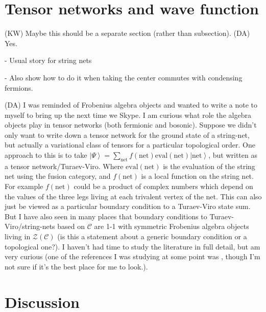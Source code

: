\documentclass[12pt,a4paper]{article}
\newcommand{\mcz}{\mathcal{Z}}
\newcommand{\mcc}{\mathcal{C}}
\newcommand{\ket}[1]{\ensuremath{\left|#1\right\rangle}}
\newcommand{\dave}[1]{{\color{ao(english)}\footnotesize{(DA) #1}}}
\newcommand{\kw}[1]{{\color{kwcolor}\footnotesize{(KW) #1}}}
\begin{document}



\section{Tensor networks and wave function}
\kw{Maybe this should be a separate section (rather than subsection).}
\dave{Yes.}

- Usual story for string nets

- Also show how to do it when taking the center commutes with condensing fermions. 


\dave{
I was reminded of Frobenius algebra objects and wanted to write a note to myself to bring up the next time we Skype.
I am curious what role the algebra objects play in tensor networks (both fermionic and bosonic).
Suppose we didn't only want to write down a tensor network for the ground state of a string-net, 
but actually a variational class of tensors for a particular topological order.
One approach to this is to take $\ket{\Psi} = \sum_{\text{net}} f(\text{net}) \text{eval}(\text{net}) \ket{\text{net}}$, but written as a tensor network/Turaev-Viro. 
Where $\text{eval}(\text{net})$ is the evaluation of the string net using the fusion category, 
and $f(\text{net})$ is a local function on the string net.
For example $f(\text{net})$ could be a product of complex numbers which depend on the values of the three legs living at each trivalent vertex of the net. 
This can also just be viewed as a particular boundary condition to a Turaev-Viro state sum.
But I have also seen in many places that boundary conditions to Turaev-Viro/string-nets 
based on $\mcc$ are 1-1 with symmetric Frobenius algebra objects living in $\mcz(\mcc)$ (is this a statement about a generic boundary condition or a topological one?).
I haven't had time to study the literature in full detail, but am very curious 
(one of the references I was studying at some point was \cite{Schauenburg2001}, 
though I'm not sure if it's the best place for me to look.).
}

 
\section{Discussion} \label{discussion}
\end{document}
